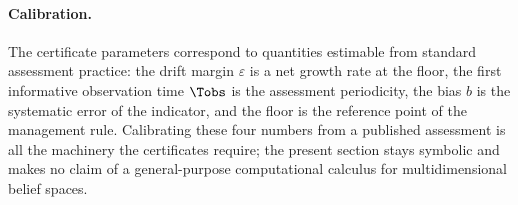 \paragraph{Calibration.} The certificate parameters correspond to quantities estimable from standard assessment practice: the drift margin $\varepsilon$ is a net growth rate at the floor, the first informative observation time $\Tobs$ is the assessment periodicity, the bias $b$ is the systematic error of the indicator, and the floor is the reference point of the management rule. Calibrating these four numbers from a published assessment is all the machinery the certificates require; the present section stays symbolic and makes no claim of a general-purpose computational calculus for multidimensional belief spaces.
